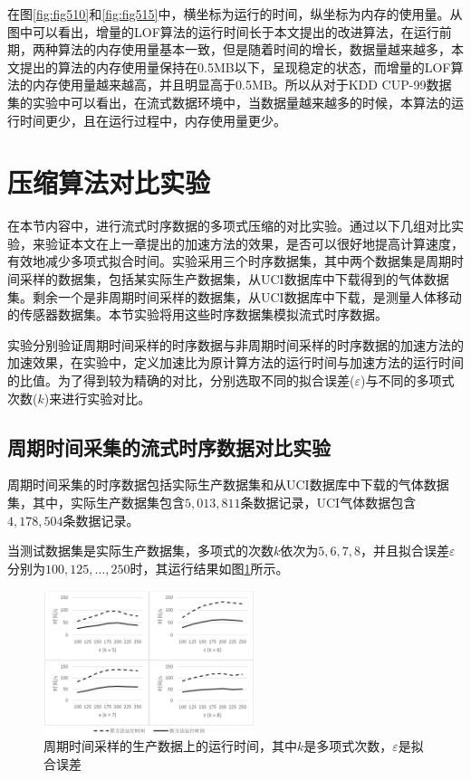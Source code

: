 在图\ref{fig:fig510}和\ref{fig:fig515}中，横坐标为运行的时间，纵坐标为内存的使用量。从图中可以看出，增量的LOF算法的运行时间长于本文提出的改进算法，在运行前期，两种算法的内存使用量基本一致，但是随着时间的增长，数据量越来越多，本文提出的算法的内存使用量保持在0.5MB以下，呈现稳定的状态，而增量的LOF算法的内存使用量越来越高，并且明显高于0.5MB。所以从对于KDD CUP-99数据集的实验中可以看出，在流式数据环境中，当数据量越来越多的时候，本算法的运行时间更少，且在运行过程中，内存使用量更少。


\section{压缩算法对比实验}
在本节内容中，进行流式时序数据的多项式压缩的对比实验。通过以下几组对比实验，来验证本文在上一章提出的加速方法的效果，是否可以很好地提高计算速度，有效地减少多项式拟合时间。实验采用三个时序数据集，其中两个数据集是周期时间采样的数据集，包括某实际生产数据集，从UCI数据库中下载得到的气体数据集。剩余一个是非周期时间采样的数据集，从UCI数据库中下载，是测量人体移动的传感器数据集。本节实验将用这些时序数据集模拟流式时序数据。

实验分别验证周期时间采样的时序数据与非周期时间采样的时序数据的加速方法的加速效果，在实验中，定义加速比为原计算方法的运行时间与加速方法的运行时间的比值。为了得到较为精确的对比，分别选取不同的拟合误差($\varepsilon $)与不同的多项式次数($k$)来进行实验对比。

\subsection{周期时间采集的流式时序数据对比实验}
周期时间采集的时序数据包括实际生产数据集和从UCI数据库中下载的气体数据集，其中，实际生产数据集包含$5,013,811$条数据记录，UCI气体数据包含$4,178,504$条数据记录。

当测试数据集是实际生产数据集，多项式的次数$k$依次为$5,6,7,8$，并且拟合误差$\varepsilon$分别为$100,125,...,250$时，其运行结果如图\ref{fig:fig621}所示。

\begin{figure}[htb]
	\centering
	\includegraphics[width=0.55\textwidth]{figures/figure62x1product}
	\caption{周期时间采样的生产数据上的运行时间，其中$k$是多项式次数，$\varepsilon$是拟合误差}\label{fig:fig621}
\end{figure}

